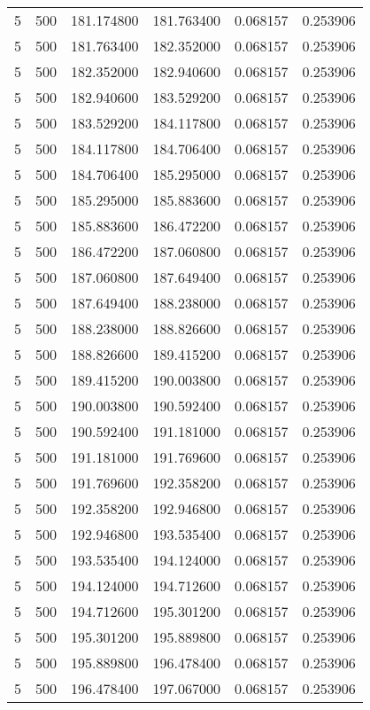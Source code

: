\begin{longtable}{rrrrrr}
5 & 500 & 181.174800 & 181.763400 & 0.068157 & 0.253906 \\
5 & 500 & 181.763400 & 182.352000 & 0.068157 & 0.253906 \\
5 & 500 & 182.352000 & 182.940600 & 0.068157 & 0.253906 \\
5 & 500 & 182.940600 & 183.529200 & 0.068157 & 0.253906 \\
5 & 500 & 183.529200 & 184.117800 & 0.068157 & 0.253906 \\
5 & 500 & 184.117800 & 184.706400 & 0.068157 & 0.253906 \\
5 & 500 & 184.706400 & 185.295000 & 0.068157 & 0.253906 \\
5 & 500 & 185.295000 & 185.883600 & 0.068157 & 0.253906 \\
5 & 500 & 185.883600 & 186.472200 & 0.068157 & 0.253906 \\
5 & 500 & 186.472200 & 187.060800 & 0.068157 & 0.253906 \\
5 & 500 & 187.060800 & 187.649400 & 0.068157 & 0.253906 \\
5 & 500 & 187.649400 & 188.238000 & 0.068157 & 0.253906 \\
5 & 500 & 188.238000 & 188.826600 & 0.068157 & 0.253906 \\
5 & 500 & 188.826600 & 189.415200 & 0.068157 & 0.253906 \\
5 & 500 & 189.415200 & 190.003800 & 0.068157 & 0.253906 \\
5 & 500 & 190.003800 & 190.592400 & 0.068157 & 0.253906 \\
5 & 500 & 190.592400 & 191.181000 & 0.068157 & 0.253906 \\
5 & 500 & 191.181000 & 191.769600 & 0.068157 & 0.253906 \\
5 & 500 & 191.769600 & 192.358200 & 0.068157 & 0.253906 \\
5 & 500 & 192.358200 & 192.946800 & 0.068157 & 0.253906 \\
5 & 500 & 192.946800 & 193.535400 & 0.068157 & 0.253906 \\
5 & 500 & 193.535400 & 194.124000 & 0.068157 & 0.253906 \\
5 & 500 & 194.124000 & 194.712600 & 0.068157 & 0.253906 \\
5 & 500 & 194.712600 & 195.301200 & 0.068157 & 0.253906 \\
5 & 500 & 195.301200 & 195.889800 & 0.068157 & 0.253906 \\
5 & 500 & 195.889800 & 196.478400 & 0.068157 & 0.253906 \\
5 & 500 & 196.478400 & 197.067000 & 0.068157 & 0.253906 \\

\end{longtable}
